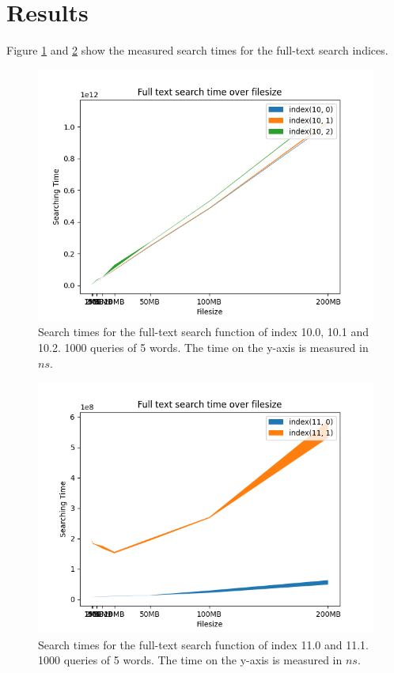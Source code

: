 \section{Results}
Figure \ref{fig:Searchtimefulltext10} and \ref{fig:Searchtimefulltext11} show the measured search times for the full-text search indices.

\begin{figure}[ht!]
    \centering
    \includegraphics[width=.8\textwidth]{LaTeX/Pictures/Results/Fulltext[(10, 0), (10, 1), (10, 2)].png}
    \caption{Search times for the full-text search function of index 10.0, 10.1 and 10.2. 1000 queries of 5 words. The time on the y-axis is measured in $ns$.}
    \label{fig:Searchtimefulltext10}
\end{figure}

\begin{figure}[ht!]
    \centering
    \includegraphics[width=.8\textwidth]{LaTeX/Pictures/Results/Fulltext[(11, 0), (11, 1)].png}
    \caption{Search times for the full-text search function of index 11.0 and 11.1. 1000 queries of 5 words. The time on the y-axis is measured in $ns$.}
    \label{fig:Searchtimefulltext11}
\end{figure}

